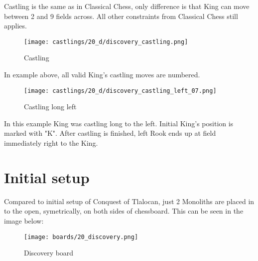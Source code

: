 Castling is the same as in Classical Chess, only difference is that King can move between 2 and 9 fields across.
All other constraints from Classical Chess still applies.

\noindent
\begin{figure}[!h]
\texttt{[image: castlings/20\_d/discovery\_castling.png]}
\caption{Castling}
\label{fig:discovery_castling}
\end{figure}

In example above, all valid King's castling moves are numbered.

\noindent
\begin{figure}[!h]
\texttt{[image: castlings/20\_d/discovery\_castling\_left\_07.png]}
\caption{Castling long left}
\label{fig:discovery_castling_left_07}
\end{figure}

In this example King was castling long to the left. Initial King's position is marked with "K".
After castling is finished, left Rook ends up at field immediately right to the King.

\clearpage %

\section*{Initial setup}

Compared to initial setup of Conquest of Tlalocan, just 2 Monoliths are placed in to the open,
symetrically, on both sides of chessboard. This can be seen in the image below:

\noindent
\begin{figure}[h]
\texttt{[image: boards/20\_discovery.png]}
\caption{Discovery board}
\label{fig:20_discovery}
\end{figure}

\clearpage %
